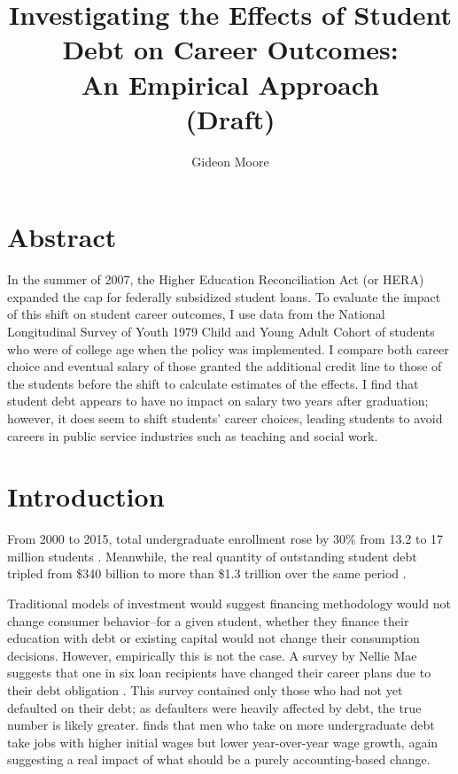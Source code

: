 \documentclass{article}
\title{Investigating the Effects of Student Debt on Career Outcomes:\\ An Empirical Approach\\(Draft)}
\author{Gideon Moore}
\begin{document}
	{ \maketitle}
	
	
	\section*{Abstract}
	
	In the summer of 2007, the Higher Education Reconciliation Act (or HERA) expanded the cap for federally subsidized student loans. To evaluate the impact of this shift on student career outcomes, I use data from the National Longitudinal Survey of Youth 1979 Child and Young Adult Cohort of students who were of college age when the policy was implemented. I compare both career choice and eventual salary of those granted the additional credit line to those of the students before the shift to calculate estimates of the effects. I find that student debt appears to have no impact on salary two years after graduation; however, it does seem to shift students' career choices, leading students to avoid careers in public service industries such as teaching and social work.
	
	\pagebreak
	
	\section{Introduction}
	
	From 2000 to 2015, total undergraduate enrollment rose by 30\% from 13.2 to 17 million students \parencite{mcfarland2017}. Meanwhile, the real quantity of outstanding student debt tripled from \$340 billion to more than \$1.3 trillion over the same period \parencite{feiveson2018}.
	
	Traditional models of investment would suggest financing methodology would not change consumer behavior--for a given student, whether they finance their education with debt or existing capital would not change their consumption decisions. However, empirically this is not the case. A survey by Nellie Mae suggests that one in six loan recipients have changed their career plans due to their debt obligation \parencite{baum2003}. This survey contained only those who had not yet defaulted on their debt; as defaulters were heavily affected by debt, the true number is likely greater. \textcite{minicozzi2005} finds that men who take on more undergraduate debt take jobs with higher initial wages but lower year-over-year wage growth, again suggesting a real impact of what should be a purely accounting-based change. 
	
\end{document}

